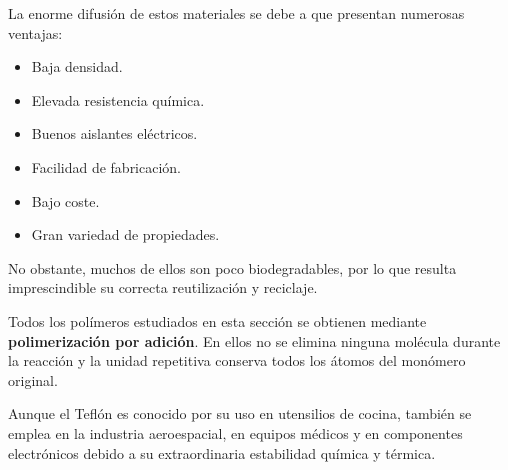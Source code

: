 La enorme difusión de estos materiales se debe a que presentan numerosas ventajas:

\begin{itemize}

\item Baja densidad.

\item Elevada resistencia química.

\item Buenos aislantes eléctricos.

\item Facilidad de fabricación.

\item Bajo coste.

\item Gran variedad de propiedades.

\end{itemize}

No obstante, muchos de ellos son poco biodegradables, por lo que resulta imprescindible
su correcta reutilización y reciclaje.


\begin{tcolorbox}[
title=Importante,
colback=blue!5,
colframe=blue!70!black]

Todos los polímeros estudiados en esta sección se obtienen mediante
\textbf{polimerización por adición}. En ellos no se elimina ninguna molécula durante
la reacción y la unidad repetitiva conserva todos los átomos del monómero original.

\end{tcolorbox}


\begin{tcolorbox}[
title=Curiosidad,
colback=green!5,
colframe=green!60!black]

Aunque el Teflón es conocido por su uso en utensilios de cocina, también se emplea en
la industria aeroespacial, en equipos médicos y en componentes electrónicos debido a
su extraordinaria estabilidad química y térmica.

\end{tcolorbox}


